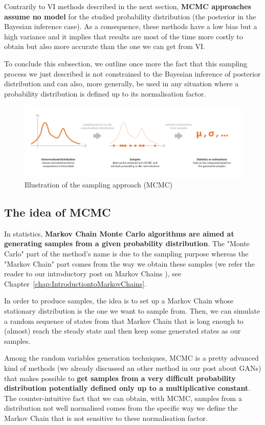 Contrarily to VI methods described in the next section, \textbf{MCMC approaches assume no model} for the studied probability distribution (the posterior in the Bayesian inference case). As a consequence, these methods have a low bias but a high variance and it implies that results are most of the time more costly to obtain but also more accurate than the one we can get from VI.

To conclude this subsection, we outline once more the fact that this sampling process we just described is not constrained to the Bayesian inference of posterior distribution and can also, more generally, be used in any situation where a probability distribution is defined up to its normalisation factor.


\begin{figure}[h]
    \centering
\includegraphics[width=\textwidth]{pic/p05c08-snip03.png}
    \caption{Illustration of the sampling approach (MCMC)}
    \label{fig:p05c08-snip03}
\end{figure}


\subsection{The idea of MCMC}

In statistics, \textbf{Markov Chain Monte Carlo algorithms are aimed at generating samples from a given probability distribution}. The "Monte Carlo" part of the method's name is due to the sampling purpose whereas the "Markov Chain" part comes from the way we obtain these samples (we refer the reader to our introductory post on Markov Chains \cite{JosephRoccaMarkovChains2019}), see Chapter~\ref{chap:IntroductiontoMarkovChains}.


In order to produce samples, the idea is to set up a Markov Chain whose stationary distribution is the one we want to sample from. Then, we can simulate a random sequence of states from that Markov Chain that is long enough to (almost) reach the steady state and then keep some generated states as our samples.

Among the random variables generation techniques, MCMC is a pretty advanced kind of methods (we already discussed an other method in our post about GANs) that makes possible to \textbf{get samples from a very difficult probability distribution potentially defined only up to a multiplicative constant}. The counter-intuitive fact that we can obtain, with MCMC, samples from a distribution not well normalised comes from the specific way we define the Markov Chain that is not sensitive to these normalisation factor.


